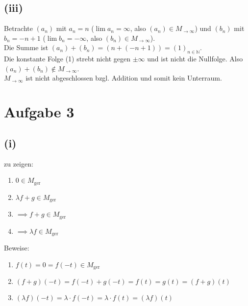 \documentclass{article}
\begin{document}
\subsection*{(iii)}
Betrachte $(a_n)$ mit $a_n = n$ ($\lim a_n = \infty$, also $(a_n) \in M_{\rightarrow \infty}$) und $(b_n)$ mit $b_n = -n+1$ ($\lim b_n = -\infty$, also $(b_n) \in M_{\rightarrow \infty}$). \\
Die Summe ist $(a_n) + (b_n) = (n + (-n+1)) = (1)_{n\in\mathbb{N}}$. \\
Die konstante Folge (1) strebt nicht gegen $\pm\infty$ und ist nicht die Nullfolge. Also $(a_n)+(b_n) \notin M_{\rightarrow \infty}$. \\
$M_{\rightarrow \infty}$ ist nicht abgeschlossen bzgl. Addition und somit kein Unterraum. 

\section*{Aufgabe 3}
\subsection*{(i)}
zu zeigen:
\begin{enumerate}
    \item $0 \in M_{\text{ger}}$
    \item[] $\lambda f + g \in M_{\text{ger}}$
    \item $\implies f + g \in M_{\text{ger}}$
    \item $\implies \lambda f \in M_{\text{ger}}$
\end{enumerate}
Beweise: 
\begin{enumerate}
    \item $f(t) = 0 = f(-t) \in M_{\text{ger}}$
    \item $(f+g)(-t) = f(-t) + g(-t) = f(t) = g(t) = (f+g)(t)$
    \item $(\lambda f)(-t) = \lambda \cdot f(-t) = \lambda \cdot f(t) = (\lambda f)(t)$
\end{enumerate}
\end{document}
